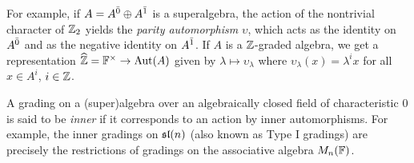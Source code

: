 For example, if $A=A^{\bar0} \oplus A^{\bar1}$ is a superalgebra, the action of the nontrivial character of $\mathbb{Z}_2$ yields the \emph{parity automorphism} $\upsilon$, which acts as the identity on $A^{\bar0}$ and as the negative identity on $A^{\bar1}$. If $A$ is a $\mathbb{Z}$-graded algebra, we get a representation $\widehat {\mathbb{Z}} = \mathbb{F}^\times \rightarrow \operatorname{Aut} (A)$ given by $\lambda \mapsto \upsilon_\lambda$ where $\upsilon_{\lambda} (x) = \lambda^i x$ for all $x\in A^i$, $i\in \mathbb{Z}$.

A grading on a (super)algebra over an algebraically closed field of characteristic $0$ is said to be \emph{inner} if it corresponds to an action by inner automorphisms. For example, the inner gradings on $\mathfrak{sl}(n)$ (also known as Type I gradings) are precisely the restrictions of gradings on the associative algebra $M_n(\mathbb{F})$.
